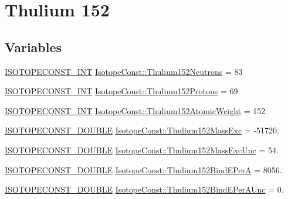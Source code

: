 \hypertarget{group___isotope_const-_thulium-_tm152}{}\section{Thulium 152}
\label{group___isotope_const-_thulium-_tm152}
\subsection*{Variables}
\begin{DoxyCompactItemize}
\item 
\mbox{\hyperlink{group___isotope_const-_macros_ga5f18360b3e99483a35c32d789e62621c}{I\+S\+O\+T\+O\+P\+E\+C\+O\+N\+S\+T\+\_\+\+I\+NT}} \mbox{\hyperlink{group___isotope_const-_thulium-_tm152_ga2b6aa32e94ee3117d59bcdcaf9e8cc8f}{Isotope\+Const\+::\+Thulium152\+Neutrons}} = 83
\item 
\mbox{\hyperlink{group___isotope_const-_macros_ga5f18360b3e99483a35c32d789e62621c}{I\+S\+O\+T\+O\+P\+E\+C\+O\+N\+S\+T\+\_\+\+I\+NT}} \mbox{\hyperlink{group___isotope_const-_thulium-_tm152_ga10d37109fb47987f1a6aba41a88a65f4}{Isotope\+Const\+::\+Thulium152\+Protons}} = 69
\item 
\mbox{\hyperlink{group___isotope_const-_macros_ga5f18360b3e99483a35c32d789e62621c}{I\+S\+O\+T\+O\+P\+E\+C\+O\+N\+S\+T\+\_\+\+I\+NT}} \mbox{\hyperlink{group___isotope_const-_thulium-_tm152_ga4d8d8825f0a9bdd8d08ed8bf4fdaf767}{Isotope\+Const\+::\+Thulium152\+Atomic\+Weight}} = 152
\item 
\mbox{\hyperlink{group___isotope_const-_macros_ga8f45a7272ce02c0b4c65c44636ed719a}{I\+S\+O\+T\+O\+P\+E\+C\+O\+N\+S\+T\+\_\+\+D\+O\+U\+B\+LE}} \mbox{\hyperlink{group___isotope_const-_thulium-_tm152_ga6cc36521b25834a93e03f24454d5c7a0}{Isotope\+Const\+::\+Thulium152\+Mass\+Exc}} = -\/51720.
\item 
\mbox{\hyperlink{group___isotope_const-_macros_ga8f45a7272ce02c0b4c65c44636ed719a}{I\+S\+O\+T\+O\+P\+E\+C\+O\+N\+S\+T\+\_\+\+D\+O\+U\+B\+LE}} \mbox{\hyperlink{group___isotope_const-_thulium-_tm152_gacec5f483f51274a3f6762fcdd9af79bf}{Isotope\+Const\+::\+Thulium152\+Mass\+Exc\+Unc}} = 54.
\item 
\mbox{\hyperlink{group___isotope_const-_macros_ga8f45a7272ce02c0b4c65c44636ed719a}{I\+S\+O\+T\+O\+P\+E\+C\+O\+N\+S\+T\+\_\+\+D\+O\+U\+B\+LE}} \mbox{\hyperlink{group___isotope_const-_thulium-_tm152_ga3ae7eafe123dcea57d485f2597ad0469}{Isotope\+Const\+::\+Thulium152\+Bind\+E\+PerA}} = 8056.
\item 
\mbox{\hyperlink{group___isotope_const-_macros_ga8f45a7272ce02c0b4c65c44636ed719a}{I\+S\+O\+T\+O\+P\+E\+C\+O\+N\+S\+T\+\_\+\+D\+O\+U\+B\+LE}} \mbox{\hyperlink{group___isotope_const-_thulium-_tm152_gaec2bfb2602019fdb830eda445cb999ce}{Isotope\+Const\+::\+Thulium152\+Bind\+E\+Per\+A\+Unc}} = 0.

\end{DoxyCompactItemize}
